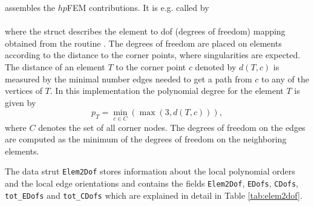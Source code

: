   assembles the $hp$FEM contributions. It is e.g. called by \\

 \\

 where the struct  \label{elem2dof} describes the element to dof (degrees of freedom) mapping obtained from the routine . The degrees of freedom are placed on elements according to the distance to the corner points, where singularities are expected. The distance of an element $T$ to the corner point $c$ denoted by $d(T,c)$ is measured by the minimal number edges needed to get a path from $c$ to any of the vertices of $T$. In this implementation the polynomial degree for the element $T$ is given by
\begin{equation}
  p_T = \min_{c \in C} (\max(3,d(T,c))),
\end{equation}
where $C$ denotes the set of all corner nodes. The degrees of freedom on the edges are computed as the minimum of the degrees of freedom on the neighboring elements.


The data strut {\tt Elem2Dof} stores information about the local polynomial orders and the local edge orientations and contains the fields {\tt Elem2Dof}, {\tt EDofs}, {\tt CDofs}, {\tt tot\_EDofs} and {\tt tot\_CDofs} which are explained in detail in Table \ref{tab:elem2dof}. 

